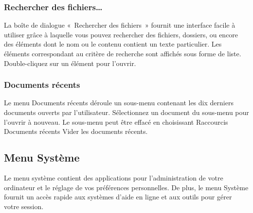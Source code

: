 \subsubsection{Rechercher des fichiers\ldots{}}
La boîte de dialogue «~Rechercher des fichiers~» fournit une interface facile à utiliser grâce à laquelle vous pouvez rechercher des fichiers, dossiers, ou encore des éléments dont le nom ou le contenu contient un texte particulier. Les éléments correspondant au critère de recherche sont affichés sous forme de liste. Double-cliquez sur un élément pour l'ouvrir. 
\subsubsection{Documents récents}
Le menu Documents récents déroule un sous-menu contenant les dix derniers documents ouverts par l'utilisateur. Sélectionnez un document du sous-menu pour l'ouvrir à nouveau. Le sous-menu peut être effacé en choisissant Raccourcis \FlecheDroite  Documents récents \FlecheDroite  Vider les documents récents.
\subsection{Menu Système}
Le menu système contient des applications pour l'administration de votre ordinateur et le réglage de vos préférences personnelles. De plus, le menu Système fournit un accès rapide aux systèmes d'aide en ligne et aux outils pour gérer votre session. 
